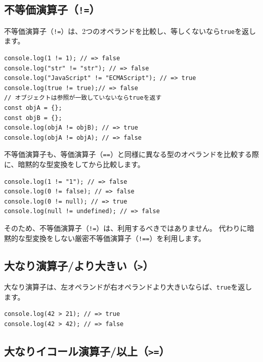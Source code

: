 \hypertarget{not-equal-operator}{%
\subsection{\texorpdfstring{不等価演算子（\texttt{!=}）}{不等価演算子（!=）}}\label{not-equal-operator}}

不等価演算子（\texttt{!=}）は、2つのオペランドを比較し、等しくないなら\texttt{true}を返します。

\begin{lstlisting}
console.log(1 != 1); // => false
console.log("str" != "str"); // => false
console.log("JavaScript" != "ECMAScript"); // => true
console.log(true != true);// => false
// オブジェクトは参照が一致していないならtrueを返す
const objA = {};
const objB = {};
console.log(objA != objB); // => true
console.log(objA != objA); // => false
\end{lstlisting}

不等価演算子も、等価演算子（\texttt{==}）と同様に異なる型のオペランドを比較する際に、暗黙的な型変換をしてから比較します。

\begin{lstlisting}
console.log(1 != "1"); // => false
console.log(0 != false); // => false
console.log(0 != null); // => true
console.log(null != undefined); // => false
\end{lstlisting}

そのため、不等価演算子（\texttt{!=}）は、利用するべきではありません。
代わりに暗黙的な型変換をしない厳密不等価演算子（\texttt{!==}）を利用します。

\hypertarget{more-than}{%
\subsection{\texorpdfstring{大なり演算子/より大きい（\texttt{\textgreater{}}）}{大なり演算子/より大きい（\textgreater{}）}}\label{more-than}}

大なり演算子は、左オペランドが右オペランドより大きいならば、\texttt{true}を返します。

\begin{lstlisting}
console.log(42 > 21); // => true
console.log(42 > 42); // => false
\end{lstlisting}

\hypertarget{more-than-equal}{%
\subsection{\texorpdfstring{大なりイコール演算子/以上（\texttt{\textgreater{}=}）}{大なりイコール演算子/以上（\textgreater{}=）}}\label{more-than-equal}}

